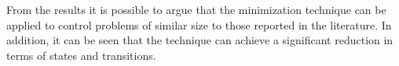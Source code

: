 
From the results it is possible to argue that the minimization technique can be applied to control problems of similar size to those reported in the literature. 
In addition, it can be seen that the technique can achieve a significant reduction in terms of states and transitions.


